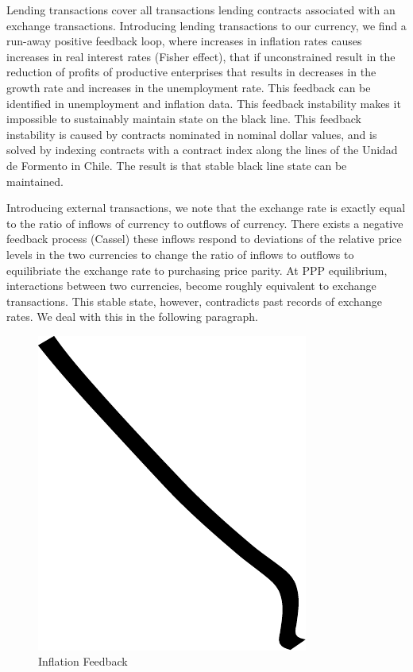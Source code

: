 Lending transactions cover all transactions lending contracts associated with an exchange
transactions. Introducing lending transactions to our currency, we find a run-away positive feedback
loop, where increases in inflation rates causes increases in real interest rates (Fisher effect),
that if unconstrained result in the reduction of profits of productive enterprises that results in
decreases in the growth rate and increases in the unemployment rate. This feedback can be identified
in unemployment and inflation data. This feedback instability makes it impossible to sustainably
maintain state on the black line. This feedback instability is caused by contracts nominated in
nominal dollar values, and is solved by indexing contracts with a contract index along the lines of
the Unidad de Formento in Chile. The result is that stable black line state can be maintained.

Introducing external transactions, we note that the exchange rate is exactly equal to the ratio of
inflows of currency to outflows of currency. There exists a negative feedback process (Cassel) these
inflows respond to deviations of the relative price levels in the two currencies to change the ratio
of inflows to outflows to equilibriate the exchange rate to purchasing price parity. At PPP
equilibrium, interactions between two currencies, become roughly equivalent to exchange
transactions. This stable state, however, contradicts past records of exchange rates. We deal with
this in the following paragraph.

\begin{figure}
\centering
\includegraphics{img/example.pdf}
\caption{Inflation Feedback}
\end{figure}

